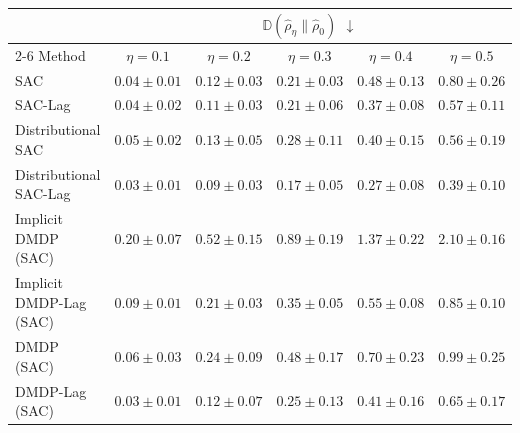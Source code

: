 \begin{tabular}{lccccc}
\toprule
 & \multicolumn{5}{c}{$\mathbb{D}(\hat{\rho}_\eta\|\hat{\rho}_0)$ $\downarrow$} \\
\cmidrule(lr){2-6}
Method & $\eta=0.1$ & $\eta=0.2$ & $\eta=0.3$ & $\eta=0.4$ & $\eta=0.5$ \\
\midrule
SAC & $0.04\pm0.01$ & $0.12\pm0.03$ & $0.21\pm0.03$ & $0.48\pm0.13$ & $0.80\pm0.26$ \\
SAC-Lag & $0.04\pm0.02$ & $0.11\pm0.03$ & $0.21\pm0.06$ & $0.37\pm0.08$ & $0.57\pm0.11$ \\
Distributional SAC & $0.05\pm0.02$ & $0.13\pm0.05$ & $0.28\pm0.11$ & $0.40\pm0.15$ & $0.56\pm0.19$ \\
Distributional SAC-Lag & $\bm{0.03\pm0.01}$ & $\bm{0.09\pm0.03}$ & $\bm{0.17\pm0.05}$ & $\bm{0.27\pm0.08}$ & $\bm{0.39\pm0.10}$ \\
Implicit DMDP (SAC) & $0.20\pm0.07$ & $0.52\pm0.15$ & $0.89\pm0.19$ & $1.37\pm0.22$ & $2.10\pm0.16$ \\
Implicit DMDP-Lag (SAC) & $0.09\pm0.01$ & $0.21\pm0.03$ & $0.35\pm0.05$ & $0.55\pm0.08$ & $0.85\pm0.10$ \\
DMDP (SAC) & $0.06\pm0.03$ & $0.24\pm0.09$ & $0.48\pm0.17$ & $0.70\pm0.23$ & $0.99\pm0.25$ \\
DMDP-Lag (SAC) & $\bm{0.03\pm0.01}$ & $0.12\pm0.07$ & $0.25\pm0.13$ & $0.41\pm0.16$ & $0.65\pm0.17$ \\
\bottomrule
\end{tabular}

